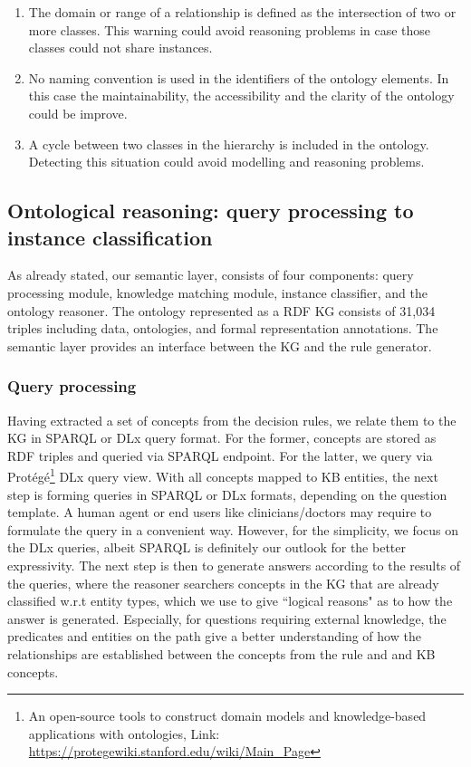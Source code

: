 \begin{enumerate}[noitemsep]
    \item The domain or range of a relationship is defined as the intersection of two or more classes. This warning could avoid reasoning problems in case those classes could not share instances. 
    \item No naming convention is used in the identifiers of the ontology elements. In this case the maintainability, the accessibility and the clarity of the ontology could be improve.
    \item A cycle between two classes in the hierarchy is included in the ontology. Detecting this situation could avoid modelling and reasoning problems.
\end{enumerate}

\subsection{Ontological reasoning: query processing to instance classification}
As already stated, our semantic layer, consists of four components: query processing module, knowledge matching module, instance classifier, and the ontology reasoner. The ontology represented as a RDF KG consists of 31,034 triples including data, ontologies, and formal representation annotations. The semantic layer provides an interface between the KG and the rule generator. %

\subsubsection{Query processing}
Having extracted a set of concepts from the decision rules, we relate them to the KG in SPARQL or DLx query format. For the former, concepts are stored as RDF triples and queried via SPARQL endpoint. For the latter, we query via Prot{\'e}g{\'e}\footnote{An open-source tools to construct domain models and knowledge-based applications with ontologies, Link: \url{https://protegewiki.stanford.edu/wiki/Main_Page}} DLx query view. 
With all concepts mapped to KB entities, the next step is forming queries in SPARQL or DLx formats, depending on the question template. 
A human agent or end users like clinicians/doctors may require to formulate the query in a convenient way. However, for the simplicity, we focus on the DLx queries, albeit SPARQL is definitely our outlook for the better expressivity. The next step is then to generate answers according to the results of the queries, where the reasoner searchers concepts in the KG that are already classified w.r.t entity types, which we use to give ``logical reasons" as to how the answer is generated. Especially, for questions requiring external knowledge, the predicates and entities on the path give a better understanding of how the relationships are established between the concepts from the rule and and KB concepts. 

